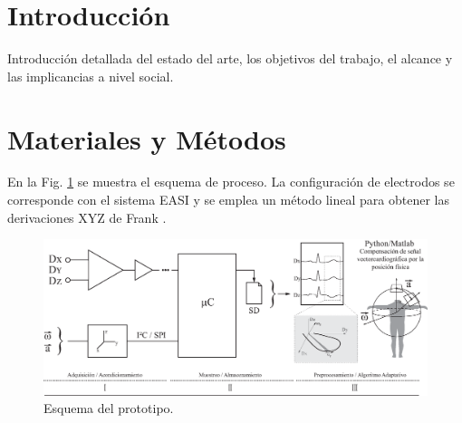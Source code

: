 \documentclass[]{article}
\begin{document}
\begin{multicols}{2}
\section{Introducción}
Introducción detallada del estado del arte, los objetivos del trabajo, el alcance y las implicancias a nivel social.

\lipsum[1] %



\section{Materiales y Métodos}
En la Fig. \ref{Fig_Esquema} se muestra el esquema de proceso. La configuración de electrodos se corresponde con el sistema EASI y se emplea un método lineal para obtener las derivaciones XYZ de Frank \cite{Feild2002}.

\end{multicols}
\begin{figure}[ht]
\centering
\includegraphics[width=\textwidth]{Imags/Esquema.eps} 
\caption{Esquema del prototipo.}
\label{Fig_Esquema}
\end{figure}
\begin{multicols}{2}

\lipsum[2-3] %

\end{multicols}

\end{document}
